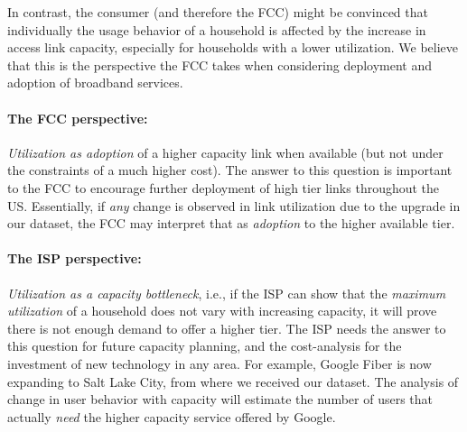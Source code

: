 In contrast, the consumer (and therefore the FCC) might be convinced that 
individually
the usage behavior of a household is affected by the increase in access link
capacity, especially for households with a lower utilization. We believe that 
this is
the perspective the FCC takes when considering deployment and adoption of 
broadband services.

\paragraph{The FCC perspective: }\emph{Utilization as adoption} of a higher capacity
link when available (but not under the constraints of a much higher cost). The answer to this
question is important to the FCC to encourage further deployment of high tier links throughout
the US. Essentially, if \emph{any} change is observed in link utilization due to the upgrade in our dataset, the FCC may interpret that as \emph{adoption} to the higher available tier.

\paragraph{The ISP perspective: }\emph{Utilization as a capacity bottleneck}, i.e., if
the ISP can show that the \emph{maximum utilization} of a household does not vary
with increasing capacity, it will prove there is not enough demand to offer a higher tier.  
The ISP needs the answer to this question for future capacity planning, and the cost-analysis
for the investment of new technology in any area.
For example, Google Fiber is now expanding to Salt Lake City, from where we received our dataset.
The analysis of change in user behavior with capacity will estimate the number of users that
actually \emph{need} the higher capacity service offered by Google.